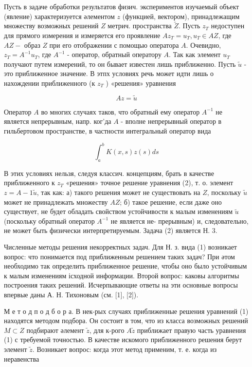 \documentclass[10pt]{article}
\begin{document}
Пусть в задаче обработки результатов физич. экспериментов изучаемый объект (явление) характеризуется әлементом $z$ (функцией, вектором), принадлежащим множеству возможных решений $Z$ метрич. пространства $\tilde{Z}$. Пусть $z_{T}$ недоступен для прямого измерения и измеряется его проявление $A z_{T}=u_{T}, u_{T} \in A Z$, где $A Z-$ образ $Z$ при его отображении с помощью оператора $A$. Очевидно, $z_{T}=A^{-1} u_{T}$, где $A^{-1}$ - оператор, обратный оператору $A$. Так как элемент $u_{T}$ получают путем измерений, то он бывает известен лишь приближенно. Пусть $\tilde{u}$ - это приближенное значение. В этпх условиях речь может идти лишь о нахождении приближенного (к $z_{T}$ ) «решения» уравнения



\[

A z=\tilde{u}

\]



Оператор $A$ во многих случаях таков, что обратный ему оператор $A^{-1}$ не является непрерывным, напр. ког'да $A$ - вполне непрерывный оператор в гильбертовом пространстве, в частности интегральный оператор вида



\[

\int_{a}^{b} K(x, s) z(s) d s

\]



В этих условиях нельзя, следуя классич. концепциям, брать в качестве приближенного к $z_{T}$ «решения» точное решение уравнения (2), т. о. элемент $z=A-1 \tilde{u}$, так как: а) такого решения может не существовать на $Z$, поскольку $\tilde{u}$ может не принадлежать множеству $A Z$; б) такое решение, если даже оно существует, не будет обладать свойством устойчивости к малым изменениям $\tilde{u}$ (поскольку обратный оператор $A^{-1}$ не является не- прерывным) и, следовательно, не может быть физически интерпретируемым. Задача (2) является Н. 3.



Численные методы решения некорректных задач. Для Н. з. вида (1) возникает вопрос: что понимается под приближенным решением таких задач? При әтом необходимо так определить приближенное решение, чтобы оно было устойчивым к малым изменениям ісходной информации. Второй вопрос: каковы алгоритмы построения таких решений. Исчерпывающие ответы на эти основные вопросы впервые даны А. Н. Тихоновым (см. [1], [2]).



М е т о д п о д б о р а. В нек-рых случаях приближенные решения уравнений (1) находятся методом подбора. Он состоит в том, что из класса возможных решений $M \subset Z$ подбирают әлемент $\tilde{z}$, для к-рого $A \tilde{z}$ приближает правую часть уравнения (1) с требуемой точностью. В качестве искомого приближенного решения берут элемент $\tilde{z}$. Возникает вопрос: когда этот метод применим, т. е. когда из неравенства
\end{document}
